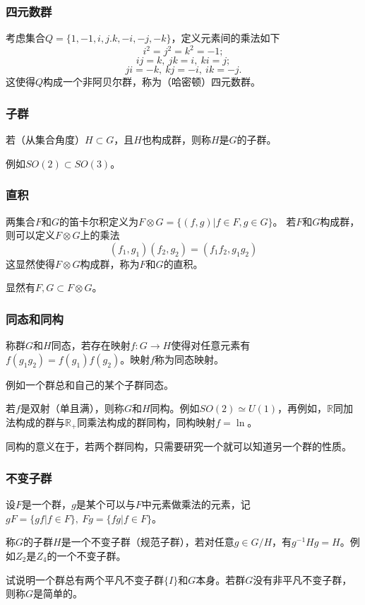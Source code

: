\documentclass[CJK]{beamer}
\newcommand{\reals}{\mathbb{R}}
\begin{document}
\begin{frame}
\frametitle{\bch 四元数群 \ech}
\bch
考虑集合$Q = \{ 1,-1,i,j.k,-i,-j,-k\}$，定义元素间的乘法如下
$$ i^2 = j^2 = k^2 = -1;$$
$$ ij = k,\ jk = i,\ ki = j;$$
$$ji = -k,\ kj = -i,\ ik = -j.$$
这使得$Q$构成一个非阿贝尔群，称为（哈密顿）四元数群。

\ech
\end{frame}


\begin{frame}
\frametitle{\bch 子群 \ech}
\bch
若（从集合角度）$H\subset G$，且$H$也构成群，则称$H$是$G$的子群。\par
例如$SO(2) \subset SO(3)$。


\ech
\end{frame}

\begin{frame}
\frametitle{\bch 直积 \ech}
\bch
两集合$F$和$G$的笛卡尔积定义为$F\otimes G = \{ (f,g) | f\in F, g \in G\}$。
若$F$和$G$构成群，则可以定义$F\otimes G$上的乘法
$$ (f_1,g_1) (f_2,g_2) = (f_1 f_2,g_1g_2)$$
这显然使得$F\otimes G$构成群，称为$F$和$G$的直积。
\par
显然有$F,G \subset F \otimes G$。


\ech
\end{frame}

\begin{frame}
\frametitle{\bch 同态和同构 \ech}
\bch
称群$G$和$H$同态，若存在映射$f: G \to H$使得对任意元素有$f(g_1 g_2) = f(g_1) f(g_2)$。映射$f$称为同态映射。
\par
例如一个群总和自己的某个子群同态。
\par
若$f$是双射（单且满），则称$G$和$H$同构。例如$SO(2) \simeq U(1)$，再例如，$\reals$同加法构成的群与$\reals_+$同乘法构成的群同构，同构映射$f = \ln$。
\par
同构的意义在于，若两个群同构，只需要研究一个就可以知道另一个群的性质。


\ech
\end{frame}


\begin{frame}
\frametitle{\bch 不变子群 \ech}
\bch
设$F$是一个群，$g$是某个可以与$F$中元素做乘法的元素，记$gF = \{ gf | f \in F\},\ Fg = \{ fg | f \in F\}$。
\par
称$G$的子群$H$是一个不变子群（规范子群），若对任意$g \in G/H$，有$g^{-1} H g = H$。例如$Z_2$是$Z_4$的一个不变子群。
\par
试说明一个群总有两个平凡不变子群$\{I\}$和$G$本身。若群$G$没有非平凡不变子群，则称$G$是简单的。


\ech
\end{frame}
\end{document}
